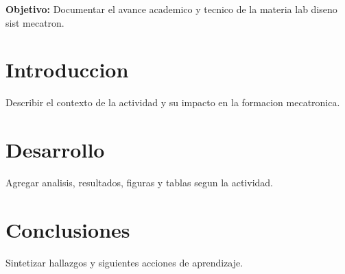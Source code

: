 \documentclass[spanish,letterpaper,oneside]{article}
\begin{document}
\templatePortrait
\templatePagecfg
\onehalfspacing

\begin{abstractd}
\textbf{Objetivo:} Documentar el avance academico y tecnico de la materia lab diseno sist mecatron.
\end{abstractd}

\templateIndex
\templateFinalcfg

\section{Introduccion}
Describir el contexto de la actividad y su impacto en la formacion mecatronica.

\section{Desarrollo}
Agregar analisis, resultados, figuras y tablas segun la actividad.

\section{Conclusiones}
Sintetizar hallazgos y siguientes acciones de aprendizaje.



\end{document}
